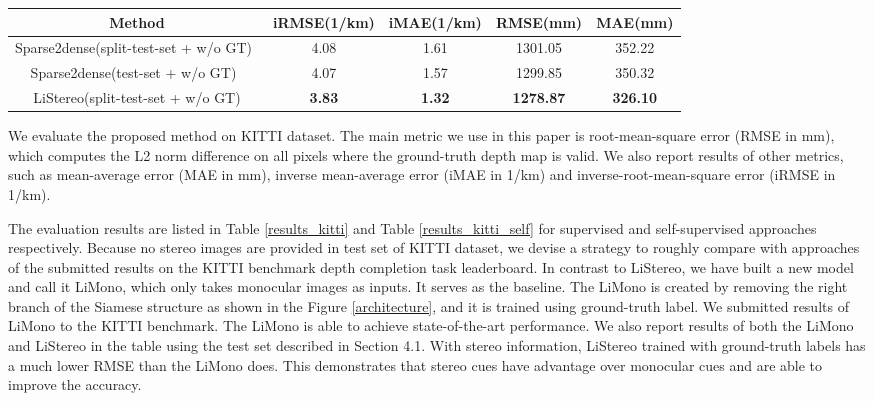 \documentclass[letterpaper, 10 pt, conference]{ieeeconf}
\begin{document}
    \begin{table*}[t!]
    \begin{center}
\begin{tabular}{|c|c|c|c|c|}
    \hline
    Method & iRMSE(1/km) & iMAE(1/km) & RMSE(mm) & MAE(mm) \\
\hline\hline
    Sparse2dense(split-test-set + w/o GT)~\cite{maSelf} & 4.08 & 1.61 & 1301.05 & 352.22\\
    Sparse2dense(test-set + w/o GT)~\cite{maSelf} & 4.07 & 1.57 & 1299.85 & 350.32\\
    \hline
    LiStereo(split-test-set + w/o GT) & \textbf{3.83} & \textbf{1.32} & \textbf{1278.87} & \textbf{326.10}\\
    \hline
    \end{tabular}
    \end{center}
    \caption{Comparison with other self-supervised methods on KITTI benchmark depth completion task. `LiStereo' refers to proposed model taking stereo images as inputs. `test-set' refers to results that are reported on KITTI test set. `split-test-set' refers to results that are reported on split test set from KITTI validation set introduced in Section 4.1. `w/o GT' refers to training model in self-supervised training manner. With stereo information, our proposed method outperforms Sparse2Dense which is trained using temporal frames. Similar results of Sparse2Dense on split-test-set and test-set justify our strategy of split validation set introduced in Section 4.1.  
    }
    \label{results_kitti_self}
    \vspace{-3mm}
    \end{table*}

    We evaluate the proposed method on KITTI dataset. The main metric we use in this paper is root-mean-square error (RMSE in mm), which computes the L2 norm difference on all pixels where the ground-truth depth map is valid. We also report results of other metrics, such as mean-average error (MAE in mm), inverse mean-average error (iMAE in 1/km) and inverse-root-mean-square error (iRMSE in 1/km). 

    The evaluation results are listed in Table \ref{results_kitti} and Table \ref{results_kitti_self} for supervised and self-supervised approaches respectively. Because no stereo images are provided in test set of KITTI dataset, we devise a strategy to roughly compare with approaches of the submitted results on the KITTI benchmark depth completion task leaderboard. In contrast to LiStereo, we have built a new model and call it LiMono, which only takes monocular images as inputs. It serves as the baseline. The LiMono is created by removing the right branch of the Siamese structure as shown in the Figure \ref{architecture}, and it is trained using ground-truth label. We submitted results of LiMono to the KITTI benchmark. The LiMono is able to achieve state-of-the-art performance. We also report results of both the LiMono and LiStereo in the table using the test set described in Section 4.1. With stereo information, LiStereo trained with ground-truth labels has a much lower RMSE than the LiMono does. This demonstrates that stereo cues have advantage over monocular cues and are able to improve the accuracy.
\end{document}
